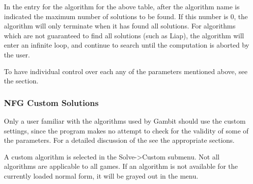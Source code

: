 {In the entry for the algorithm for the above table, after the algorithm name is 
indicated the maximum number of solutions 
to be found.  If this number is 0, the algorithm will only terminate when it has found 
all solutions.  For algorithms which are not guaranteed to find all solutions (such 
as Liap), the 
algorithm will enter an infinite loop, and continue to search until the computation is 
aborted by the user. 
 
To have individual control over each any of the parameters mentioned above, see
the  section.

\subsubsection{NFG Custom Solutions}\label{NFGCustomSolutions}
Only a user familiar with the algorithms used by Gambit should use the
custom settings, 
since the program makes no attempt to check for the validity of some of 
the parameters.  For a detailed discussion of the 
 see the appropriate sections.

A custom algorithm is selected in the Solve->Custom submenu.  Not all 
algorithms are applicable to all games.  If an algorithm is not available 
for the currently loaded normal form, it will be grayed out in the menu.

}
